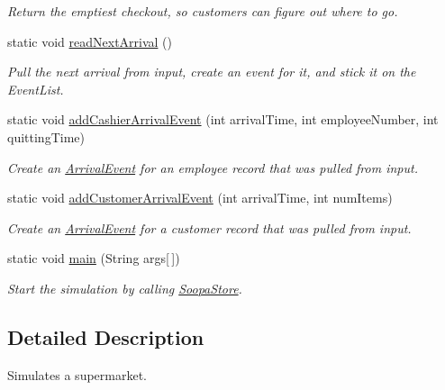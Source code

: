 \begin{CompactItemize}
\begin{CompactList}\small\item\em Return the emptiest checkout, so customers can figure out where to go. \item\end{CompactList}\item 
\hypertarget{class_soopa_store_80986490e40b21efdc13d5c0697a9cbf}{
static void \hyperlink{class_soopa_store_80986490e40b21efdc13d5c0697a9cbf}{readNextArrival} ()}
\label{class_soopa_store_80986490e40b21efdc13d5c0697a9cbf}

\begin{CompactList}\small\item\em Pull the next arrival from input, create an event for it, and stick it on the EventList. \item\end{CompactList}\item 
static void \hyperlink{class_soopa_store_07531dfae1141f6fe1874d7c535c2c37}{addCashierArrivalEvent} (int arrivalTime, int employeeNumber, int quittingTime)
\begin{CompactList}\small\item\em Create an \hyperlink{class_arrival_event}{ArrivalEvent} for an employee record that was pulled from input. \item\end{CompactList}\item 
static void \hyperlink{class_soopa_store_8f06afcdd8fd1d442039bf152cbbfe00}{addCustomerArrivalEvent} (int arrivalTime, int numItems)
\begin{CompactList}\small\item\em Create an \hyperlink{class_arrival_event}{ArrivalEvent} for a customer record that was pulled from input. \item\end{CompactList}\item 
static void \hyperlink{class_soopa_store_7dcaea26d0ff077426773425ea274c9b}{main} (String args\mbox{[}$\,$\mbox{]})
\begin{CompactList}\small\item\em Start the simulation by calling \hyperlink{class_soopa_store}{SoopaStore}. \item\end{CompactList}\end{CompactItemize}


\subsection{Detailed Description}
Simulates a supermarket. 

